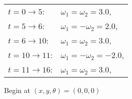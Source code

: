 \begin{longtable}[]{@{}ll@{}}
\toprule
\endhead
\begin{minipage}[t]{0.30\columnwidth}\raggedright
\(t=0  \to 5\):\strut
\end{minipage} & \begin{minipage}[t]{0.51\columnwidth}\raggedright
\(\omega_1 = \omega_2 = 3.0\),\strut
\end{minipage}\tabularnewline
\begin{minipage}[t]{0.30\columnwidth}\raggedright
\(t=5  \to 6\):\strut
\end{minipage} & \begin{minipage}[t]{0.51\columnwidth}\raggedright
\(\omega_1 = - \omega_2 = 2.0\),\strut
\end{minipage}\tabularnewline
\begin{minipage}[t]{0.30\columnwidth}\raggedright
\(t=6  \to 10\):\strut
\end{minipage} & \begin{minipage}[t]{0.51\columnwidth}\raggedright
\(\omega_1 = \omega_2 = 3.0\),\strut
\end{minipage}\tabularnewline
\begin{minipage}[t]{0.30\columnwidth}\raggedright
\(t=10 \to 11\):\strut
\end{minipage} & \begin{minipage}[t]{0.51\columnwidth}\raggedright
\(\omega_1 = -\omega_2 = -2.0\),\strut
\end{minipage}\tabularnewline
\begin{minipage}[t]{0.30\columnwidth}\raggedright
\(t=11 \to 16\):\strut
\end{minipage} & \begin{minipage}[t]{0.51\columnwidth}\raggedright
\(\omega_1 =  \omega_2 = 3.0\),\strut
\end{minipage}\tabularnewline
\bottomrule
\end{longtable}

Begin at \((x,y,\theta) =(0,0,0)\)

